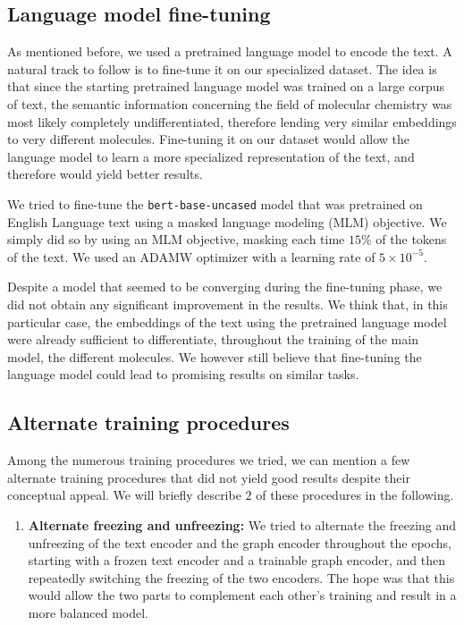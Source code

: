\documentclass[switch, 11pt]{article}
\begin{document}
\begin{multicols}{2}
    \subsection{Language model fine-tuning}
    As mentioned before, we used a pretrained language model to encode the text. A natural track to follow is to fine-tune it on our specialized dataset. The idea is that since the starting pretrained language model was trained on a large corpus of text, the semantic information concerning the field of molecular chemistry was most likely completely undifferentiated, therefore lending very similar embeddings to very different molecules. Fine-tuning it on our dataset would allow the language model to learn a more specialized representation of the text, and therefore would yield better results.

    We tried to fine-tune the \texttt{bert-base-uncased} model that was pretrained on English Language text using a masked language modeling (MLM) objective. We simply did so by using an MLM objective, masking each time $15\%$ of the tokens of the text. We used an ADAMW optimizer with a learning rate of $5\times 10^{-5}$.

    Despite a model that seemed to be converging during the fine-tuning phase, we did not obtain any significant improvement in the results. We think that, in this particular case, the embeddings of the text using the pretrained language model were already sufficient to differentiate, throughout the training of the main model, the different molecules. We however still believe that fine-tuning the language model could lead to promising results on similar tasks.
    \subsection{Alternate training procedures}
    Among the numerous training procedures we tried, we can mention a few alternate training procedures that did not yield good results despite their conceptual appeal. We will briefly describe $2$ of these procedures in the following.
    \begin{enumerate}
        \item \textbf{Alternate freezing and unfreezing: } We tried to alternate the freezing and unfreezing of the text encoder and the graph encoder throughout the epochs, starting with a frozen text encoder and a trainable graph encoder, and then repeatedly switching the freezing of the two encoders. The hope was that this would allow the two parts to complement each other's training and result in a more balanced model.


\end{enumerate}
\end{multicols}
\end{document}
